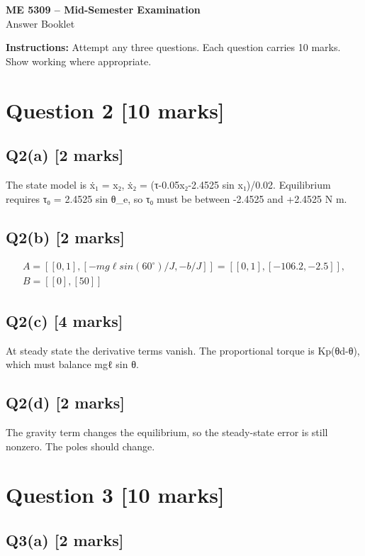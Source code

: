 \documentclass[11pt,a4paper]{article}
\begin{document}
\begin{center}
{\Large\bfseries ME 5309 -- Mid-Semester Examination}\\[3pt]
{\large Answer Booklet}\\[8pt]
\end{center}
\textbf{Instructions:} Attempt any three questions. Each question carries 10 marks. Show working where appropriate.
\section*{Question 2 \hfill [10 marks]}
\subsection*{Q2(a) \hfill [2 marks]}

The state model is ẋ₁ = x₂, ẋ₂ = (τ-0.05x₂-2.4525 sin x₁)/0.02.
Equilibrium requires τ₀ = 2.4525 sin θ\_e, so τ₀ must be between -2.4525 and +2.4525 N m.

\subsection*{Q2(b) \hfill [2 marks]}

\[\begin{aligned}A = [[0,1], [-mg\ell sin(60^{\circ})/J, -b/J]] = [[0,1], [-106.2, -2.5]],\\ B = [[0],[50]]\end{aligned}\]

\subsection*{Q2(c) \hfill [4 marks]}

At steady state the derivative terms vanish.
The proportional torque is Kp(θd-θ), which must balance mgℓ sin θ.

\subsection*{Q2(d) \hfill [2 marks]}

The gravity term changes the equilibrium, so the steady-state error is still nonzero.
The poles should change.

\section*{Question 3 \hfill [10 marks]}
\subsection*{Q3(a) \hfill [2 marks]}
\end{document}
